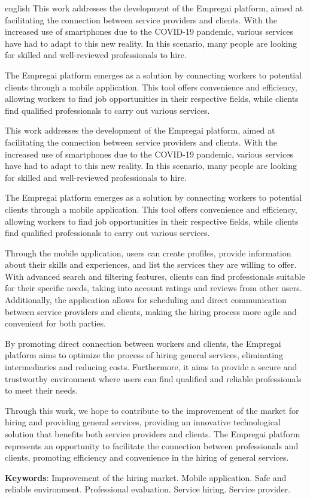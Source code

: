 \begin{resumo}[Abstract]
	\SingleSpacing
	\begin{otherlanguage*}{english}
This work addresses the development of the Empregai platform, aimed at facilitating the connection between service providers and clients. With the increased use of smartphones due to the COVID-19 pandemic, various services have had to adapt to this new reality. In this scenario, many people are looking for skilled and well-reviewed professionals to hire.

The Empregai platform emerges as a solution by connecting workers to potential clients through a mobile application. This tool offers convenience and efficiency, allowing workers to find job opportunities in their respective fields, while clients find qualified professionals to carry out various services.

This work addresses the development of the Empregai platform, aimed at facilitating the connection between service providers and clients. With the increased use of smartphones due to the COVID-19 pandemic, various services have had to adapt to this new reality. In this scenario, many people are looking for skilled and well-reviewed professionals to hire.

The Empregai platform emerges as a solution by connecting workers to potential clients through a mobile application. This tool offers convenience and efficiency, allowing workers to find job opportunities in their respective fields, while clients find qualified professionals to carry out various services.

Through the mobile application, users can create profiles, provide information about their skills and experiences, and list the services they are willing to offer. With advanced search and filtering features, clients can find professionals suitable for their specific needs, taking into account ratings and reviews from other users. Additionally, the application allows for scheduling and direct communication between service providers and clients, making the hiring process more agile and convenient for both parties.

By promoting direct connection between workers and clients, the Empregai platform aims to optimize the process of hiring general services, eliminating intermediaries and reducing costs. Furthermore, it aims to provide a secure and trustworthy environment where users can find qualified and reliable professionals to meet their needs.

Through this work, we hope to contribute to the improvement of the market for hiring and providing general services, providing an innovative technological solution that benefits both service providers and clients. The Empregai platform represents an opportunity to facilitate the connection between professionals and clients, promoting efficiency and convenience in the hiring of general services.

		\textbf{Keywords}: Improvement of the hiring market. Mobile application. Safe and reliable environment. Professional evaluation. Service hiring. Service provider.
	\end{otherlanguage*}
\end{resumo}

